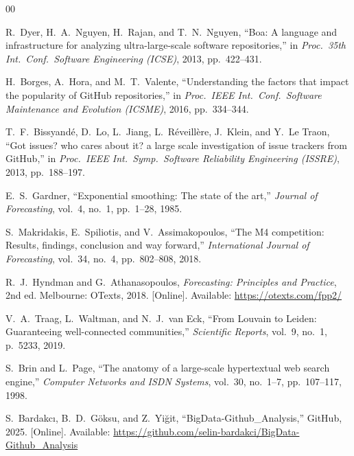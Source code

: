 \documentclass[conference]{IEEEtran}
\begin{document}
\clearpage  %
\begin{thebibliography}{00}

R.\ Dyer, H.\ A.\ Nguyen, H.\ Rajan, and T.\ N.\ Nguyen,
``Boa: A language and infrastructure for analyzing ultra-large-scale software
repositories,''
in \textit{Proc.\ 35th Int.\ Conf.\ Software Engineering (ICSE)}, 2013,
pp.\ 422--431.

H.\ Borges, A.\ Hora, and M.\ T.\ Valente,
``Understanding the factors that impact the popularity of GitHub repositories,''
in \textit{Proc.\ IEEE Int.\ Conf.\ Software Maintenance and Evolution (ICSME)},
2016, pp.\ 334--344.

T.\ F.\ Bissyandé, D.\ Lo, L.\ Jiang, L.\ Réveillère, J.\ Klein, and Y.\ Le Traon,
``Got issues? who cares about it? a large scale investigation of issue trackers
from GitHub,''
in \textit{Proc.\ IEEE Int.\ Symp.\ Software Reliability Engineering (ISSRE)},
2013, pp.\ 188--197.

E.\ S.\ Gardner,
``Exponential smoothing: The state of the art,''
\textit{Journal of Forecasting}, vol.\ 4, no.\ 1, pp.\ 1--28, 1985.

S.\ Makridakis, E.\ Spiliotis, and V.\ Assimakopoulos,
``The M4 competition: Results, findings, conclusion and way forward,''
\textit{International Journal of Forecasting}, vol.\ 34, no.\ 4,
pp.\ 802--808, 2018.

R.\ J.\ Hyndman and G.\ Athanasopoulos,
\textit{Forecasting: Principles and Practice}, 2nd ed.
Melbourne: OTexts, 2018. [Online]. Available: \url{https://otexts.com/fpp2/}

V.\ A.\ Traag, L.\ Waltman, and N.\ J.\ van Eck,
``From Louvain to Leiden: Guaranteeing well-connected communities,''
\textit{Scientific Reports}, vol.\ 9, no.\ 1, p.\ 5233, 2019.

S.\ Brin and L.\ Page,
``The anatomy of a large-scale hypertextual web search engine,''
\textit{Computer Networks and ISDN Systems}, vol.\ 30, no.\ 1--7,
pp.\ 107--117, 1998.

S.\ Bardakc\i, B.\ D.\ G\"{o}ksu, and Z.\ Yi\u{g}it,
``BigData-Github\_Analysis,'' GitHub, 2025.
[Online]. Available: \url{https://github.com/selin-bardakci/BigData-Github_Analysis}

\end{thebibliography}
\end{document}
